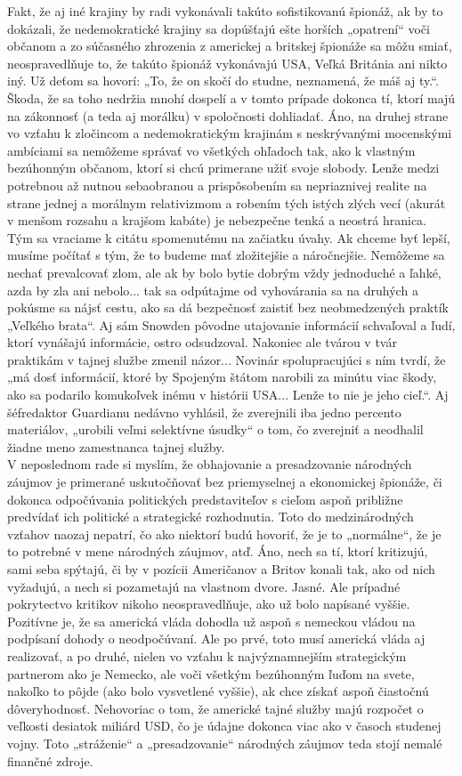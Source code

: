 \documentclass{article}
\begin{document}
\begin{flushleft}
Fakt, že aj iné krajiny by radi vykonávali takúto sofistikovanú špionáž, ak by to dokázali, že nedemokratické krajiny sa dopúšťajú ešte horších „opatrení“ voči občanom a zo súčasného zhrozenia z americkej a britskej špionáže sa môžu smiať, neospravedlňuje to, že takúto špionáž vykonávajú USA, Veľká Británia ani nikto iný. Už deťom sa hovorí: „To, že on skočí do studne, neznamená, že máš aj ty.“. Škoda, že sa toho nedržia mnohí dospelí a v tomto prípade dokonca tí, ktorí majú na zákonnosť (a teda aj morálku) v spoločnosti dohliadať. Áno, na druhej strane vo vzťahu k zločincom a nedemokratickým krajinám s neskrývanými mocenskými ambíciami sa nemôžeme správať vo všetkých ohľadoch tak, ako k vlastným bezúhonným občanom, ktorí si chcú primerane užiť svoje slobody. Lenže medzi potrebnou až nutnou sebaobranou a prispôsobením sa nepriaznivej realite na strane jednej a morálnym relativizmom a robením tých istých zlých vecí (akurát v menšom rozsahu a krajšom kabáte) je nebezpečne tenká a neostrá hranica. Tým sa vraciame k citátu spomenutému na začiatku úvahy. Ak chceme byť lepší, musíme počítať s tým, že to budeme mať zložitejšie a náročnejšie. Nemôžeme sa nechať prevalcovať zlom, ale ak by bolo bytie dobrým vždy jednoduché a ľahké, azda by zla ani nebolo... tak sa odpútajme od vyhovárania sa na druhých a pokúsme sa nájsť cestu, ako sa dá bezpečnosť zaistiť bez neobmedzených praktík „Veľkého brata“. Aj sám Snowden pôvodne utajovanie informácií schvaľoval a ľudí, ktorí vynášajú informácie, ostro odsudzoval. Nakoniec ale tvárou v tvár praktikám v tajnej službe zmenil názor... Novinár spolupracujúci s ním tvrdí, že „má dosť informácií, ktoré by Spojeným štátom narobili za minútu viac škody, ako sa podarilo komukoľvek inému v histórii USA... Lenže to nie je jeho cieľ.“. Aj šéfredaktor Guardianu nedávno vyhlásil, že zverejnili iba jedno percento materiálov, „urobili veľmi selektívne úsudky“ o tom, čo zverejniť a neodhalil žiadne meno zamestnanca tajnej služby.\\
V neposlednom rade si myslím, že obhajovanie a presadzovanie národných záujmov je primerané uskutočňovať bez priemyselnej a ekonomickej špionáže, či dokonca odpočúvania politických predstaviteľov s cieľom aspoň približne predvídať ich politické a strategické rozhodnutia. Toto do medzinárodných vzťahov naozaj nepatrí, čo ako niektorí budú hovoriť, že je to „normálne“, že je to potrebné v mene národných záujmov, atď. Áno, nech sa tí, ktorí kritizujú, sami seba spýtajú, či by v pozícii Američanov a Britov konali tak, ako od nich vyžadujú, a nech si pozametajú na vlastnom dvore. Jasné. Ale prípadné pokrytectvo kritikov nikoho neospravedlňuje, ako už bolo napísané vyššie. Pozitívne je, že sa americká vláda dohodla už aspoň s nemeckou vládou na podpísaní dohody o neodpočúvaní. Ale po prvé, toto musí americká vláda aj realizovať, a po druhé, nielen vo vzťahu k najvýznamnejším strategickým partnerom ako je Nemecko, ale voči všetkým bezúhonným ľuďom na svete, nakoľko to pôjde (ako bolo vysvetlené vyššie), ak chce získať aspoň čiastočnú dôveryhodnosť. Nehovoriac o tom, že americké tajné služby majú rozpočet o veľkosti desiatok miliárd USD, čo je údajne dokonca viac ako v časoch studenej vojny. Toto „stráženie“ a „presadzovanie“ národných záujmov teda stojí nemalé finančné zdroje.\\

\end{flushleft}
\end{document}
